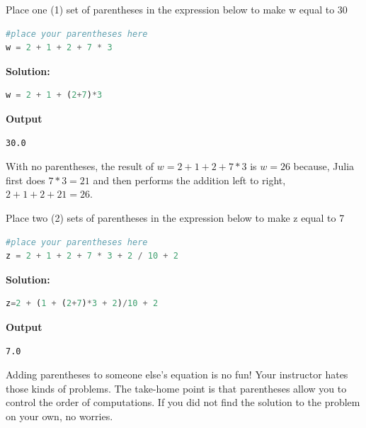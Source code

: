 


\begin{exercise}
Place one (1) set of parentheses in the expression below to make w equal to 30
\begin{lstlisting}[language=Julia,style=mystyle]
#place your parentheses here
w = 2 + 1 + 2 + 7 * 3 
\end{lstlisting}
\end{exercise}

\textbf{Solution:}

\begin{lstlisting}[language=Julia,style=mystyle]
w = 2 + 1 + (2+7)*3 
\end{lstlisting}
\textbf{Output} 
\begin{verbatim}
30.0
\end{verbatim}

\begin{rem} With no parentheses, the result of $w = 2 + 1 + 2 + 7 * 3 $ is $w=26$ because, Julia first does $7 *3=21$ and then performs the addition left to right,  $2 + 1 + 2  + 21 = 26.$

\end{rem}

\begin{exercise}
Place two (2) sets of parentheses in the expression below to make z equal to 7
\begin{lstlisting}[language=Julia,style=mystyle]
#place your parentheses here
z = 2 + 1 + 2 + 7 * 3 + 2 / 10 + 2
\end{lstlisting}
\end{exercise}

\textbf{Solution:}

\begin{lstlisting}[language=Julia,style=mystyle]
z=2 + (1 + (2+7)*3 + 2)/10 + 2
\end{lstlisting}
\textbf{Output} 
\begin{verbatim}
7.0
\end{verbatim}

\begin{rem}
Adding parentheses to someone else's equation is no fun! Your instructor hates those kinds of problems. The take-home point is that parentheses allow you to control the order of computations. If you did not find the solution to the problem on your own, no worries. 
\end{rem}

